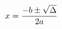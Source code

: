 \documentclass[preview]{standalone}
\begin{document}
\begin{align*}
\special{dvisvgm:raw <g id='unique000'>}x=\frac{-b\pm\sqrt{\Delta}}{2a}\special{dvisvgm:raw </g>}
\end{align*}
\end{document}
